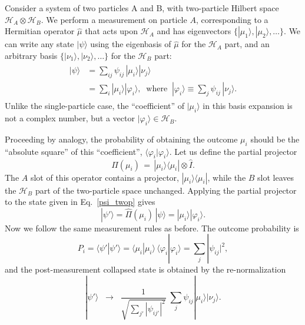 \documentclass[pra,12pt]{revtex4}
\begin{document}
Consider a system of two particles A and B, with two-particle Hilbert
space $\mathscr{H}_A \otimes \mathscr{H}_B$.  We perform a measurement
on particle $A$, corresponding to a Hermitian operator $\hat{\mu}$
that acts upon $\mathscr{H}_A$ and has eigenvectors $\{|\mu_1\rangle,
|\mu_2\rangle,\dots\}$.  We can write any state $|\psi\rangle$ using
the eigenbasis of $\hat{\mu}$ for the $\mathscr{H}_A$ part, and an
arbitrary basis $\{|\nu_1\rangle, |\nu_2\rangle,\dots\}$ for the
$\mathscr{H}_B$ part:
\begin{align}
  \begin{aligned}|\psi\rangle &= \sum_{ij} \psi_{ij}\, |\mu_i\rangle |\nu_j\rangle \\&= \sum_i |\mu_i\rangle |\varphi_i\rangle, \;\;\mathrm{where}\;\;|\varphi_i\rangle\equiv \sum_j \psi_{ij}\,|\nu_j\rangle.\end{aligned}
  \label{psi_twop}
\end{align}
Unlike the single-particle case, the ``coefficient'' of
$|\mu_i\rangle$ in this basis expansion is not a complex number, but a
vector $|\varphi_i\rangle \in \mathscr{H}_B$.

Proceeding by analogy, the probability of obtaining the outcome
$\mu_i$ should be the ``absolute square'' of this ``coefficient'',
$\langle\varphi_i|\varphi_i\rangle$.  Let us define the partial
projector
\begin{equation}
  \hat{\Pi}(\mu_i) \,=\, |\mu_i\rangle\langle \mu_i| \otimes  \hat{I}.
\end{equation}
The $A$ slot of this operator contains a projector,
$|\mu_i\rangle\langle \mu_i|$, while the $B$ slot leaves the
$\mathscr{H}_B$ part of the two-particle space unchanged.  Applying
the partial projector to the state given in Eq.~\eqref{psi_twop} gives
\begin{equation}
  |\psi'\rangle = \hat{\Pi}(\mu_i)\, |\psi\rangle
  = |\mu_i\rangle |\varphi_i\rangle.
\end{equation}
Now we follow the same measurement rules as before.  The outcome
probability is
\begin{equation}
  P_i = \langle\psi'|\psi'\rangle = \langle \mu_i|\mu_i\rangle\, \langle \varphi_i|\varphi_i\rangle = \sum_j |\psi_{ij}|^2,
\end{equation}
and the post-measurement collapsed state is obtained by the
re-normalization
\begin{equation}
  |\psi'\rangle
 \;\;\rightarrow\;\;
 \frac{1}{\sqrt{\sum_{j'} |\psi_{ij'}|^2}}\;
 \sum_{j} \psi_{ij} |\mu_i\rangle |\nu_j\rangle.
\end{equation}
\end{document}

